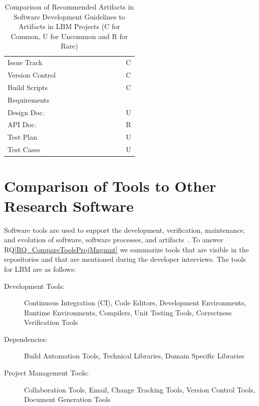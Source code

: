 \documentclass[runningheads]{llncs}
\newcommand{\rqref}[1]{RQ\ref{#1}}
\begin{document}
\begin{table}[!h]
\begin{center}
\begin{tabular}{ p{2.5cm}p{1cm}p{1cm}p{1cm}p{1cm}p{1cm}p{1cm}p{1cm}p{1cm}p{1cm}p{0.8cm} }
	\midrule
	Issue Track &  & \checkmark & \checkmark & & \checkmark & \checkmark & \checkmark & & \checkmark & C\\
	Version Control &  & \checkmark & \checkmark & \checkmark & \checkmark & \checkmark & \checkmark & \checkmark & \checkmark & C\\ 
	Build Scripts &  & \checkmark &  & \checkmark & \checkmark & \checkmark &
	\checkmark & & \checkmark & C\\
	\midrule
	Requirements &  & \checkmark &  &  & & \checkmark &  &  & \checkmark &  \\
	Design Doc.\ &  & \checkmark  & \checkmark &  & \checkmark & & \checkmark &
	\checkmark& \checkmark & U\\
	API Doc. &  &  &  &  & \checkmark & & \checkmark & \checkmark & \checkmark & R\\
	Test Plan &  & \checkmark &  &  & & \checkmark & & & &  U\\
	Test Cases & \checkmark & \checkmark & \checkmark &  & \checkmark & \checkmark &
	\checkmark & \checkmark & \checkmark & U\\
	\midrule
	\end{tabular}
	\caption{Comparison of Recommended Artifacts in Software Development Guidelines
	to Artifacts in LBM Projects (C for Common, U for Uncommon and R for Rare)}
	\label{Tbl_Guidelines}
	\end{center}
	\end{table}
	
\section{Comparison of Tools to Other Research Software}
\label{Sec_CompareTools}

Software tools are used to support the development, verification, maintenance,
and evolution of software, software processes, and artifacts~\cite[p.\
501]{GhezziEtAl2003}. To answer \rqref{RQ_CompareToolsProjMngmnt} we summarize
tools that are visible in the repositories and that are mentioned during the
developer interviews.  The tools for LBM are as follows:

\begin{description}
	\item[Development Tools:] Continuous Integration (CI), Code Editors,
	Development Environments, Runtime Environments, Compilers, Unit Testing
	Tools, Correctness Verification Tools
	\item[Dependencies:] Build Automation Tools, Technical Libraries, Domain
	Specific Libraries
	\item[Project Management Tools:] Collaboration Tools, Email, Change Tracking
	Tools, Version Control Tools, Document Generation Tools
\end{description}
\end{document}
